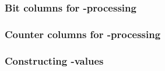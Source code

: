 \subsubsection{Bit columns for -processing}       \label{rom: push: bits}         
\subsubsection{Counter columns for -processing}   \label{rom: push: counter}      
\subsubsection{Constructing -values}              \label{rom: push: values}       
